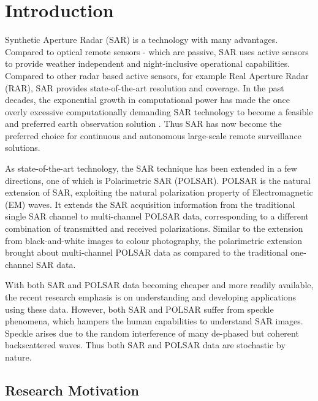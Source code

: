 \chapter{Introduction}

Synthetic Aperture Radar (SAR) is a technology with many advantages.
Compared to optical remote sensors - which are passive, SAR uses active sensors to provide weather independent and night-inclusive operational capabilities. 
Compared to other radar based active sensors,
for example Real Aperture Radar (RAR), SAR provides state-of-the-art resolution
and coverage.
In the past decades, the exponential growth in computational power has made the once overly excessive computationally demanding SAR technology to become a feasible and preferred earth observation solution \cite{Cumming_2005_Artech}.
Thus SAR has now become the preferred choice for continuous and autonomous large-scale
remote surveillance solutions.

As state-of-the-art technology, the SAR technique has been extended in a few directions, one of which is Polarimetric SAR (POLSAR).
POLSAR is the natural extension of SAR, exploiting the natural polarization property of Electromagnetic (EM) waves.
It extends the SAR acquisition information from the traditional single
SAR channel to multi-channel POLSAR data, corresponding to a different combination of transmitted and received polarizations. Similar to the extension from black-and-white images to colour photography, the polarimetric extension brought about
multi-channel POLSAR data as compared to the traditional one-channel SAR data.

With both SAR and POLSAR data becoming cheaper and more readily available, the recent research emphasis is on understanding and developing applications using these data. However, both SAR 
and POLSAR suffer from speckle phenomena, which hampers the human capabilities
to understand SAR images. Speckle arises due to the random interference of many
de-phased but coherent backscattered waves. Thus both SAR and POLSAR data are
stochastic by nature.

\section{Research Motivation}

